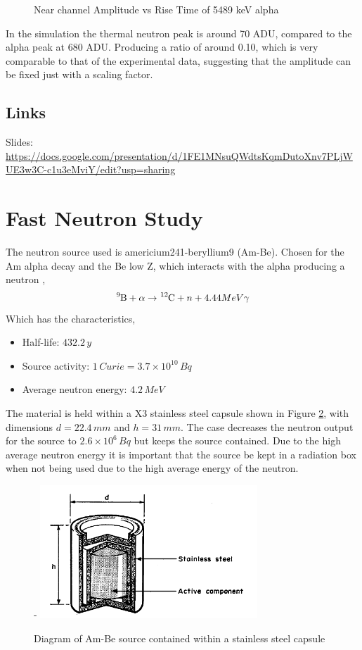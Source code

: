 \documentclass[a4paper]{article}
\begin{document}
\begin{figure}[H]
\begin{minipage}{0.5\textwidth}
        \caption{Near channel Amplitude vs Rise Time of 5489 keV alpha}
        \label{fig:prob1_6_1}
    \end{minipage}
\end{figure}
\noindent In the simulation the thermal neutron peak is around 70 ADU, compared to the alpha peak at 680 ADU. Producing a ratio of around 0.10, which is very comparable to that of the experimental data, suggesting that the amplitude can be fixed just with a scaling factor.
\subsection{Links}
Slides: \url{https://docs.google.com/presentation/d/1FE1MNsuQWdtsKqmDutoXnv7PLjWUE3w3C-c1u3eMviY/edit?usp=sharing}
\section{Fast Neutron Study}
The neutron source used is americium241-beryllium9 (Am-Be). Chosen for the Am alpha decay and the Be low Z, which interacts with the alpha producing a neutron \cite{nrc},
\begin{equation}
    \ce{^{9}B} + \alpha \rightarrow \ce{^{12}C} + n + 4.44MeV \gamma
\end{equation}
Which has the characteristics,
\begin{itemize}
    \item[] {Half-life: $432.2\,y$}
    \item[] {Source activity: $1\,Curie = 3.7 \times 10^{10}\,Bq$}
    \item[] {Average neutron energy: $4.2\,MeV$}
\end{itemize}
The material is held within a X3 stainless steel capsule shown in Figure \ref{fig:ambe}, with dimensions $d = 22.4\,mm$ and $h = 31\,mm$. The case decreases the neutron output for the source to $2.6 \times 10^{6}\,Bq$ but keeps the source contained. Due to the high average neutron energy it is important that the source be kept in a radiation box when not being used due to the high average energy of the neutron.
\begin{figure}[H]-
    \centering
    \includegraphics[height=5cm]{Fast/ambe.PNG}
    \caption{Diagram of Am-Be source contained within a stainless steel capsule}
    \label{fig:ambe}
\end{figure}
\end{document}
